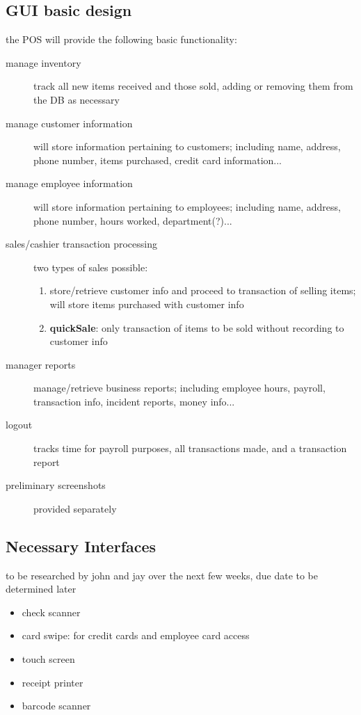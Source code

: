 \documentclass{article}
\begin{document}
\subsection{GUI basic design}
the POS will provide the following basic functionality:
\begin{description}
    \item[manage inventory] track all new items received and those sold, adding or removing them from the DB as necessary
    \item[manage customer information] will store information pertaining to customers; including name, address, phone number, items purchased, credit card information...
    \item[manage employee information] will store information pertaining to employees; including name, address, phone number, hours worked, department(?)...
    \item[sales/cashier transaction processing] two types of sales possible:
    \begin{enumerate}
        \item store/retrieve customer info and proceed to transaction of selling items; will store items purchased with customer info
        \item {\bf quickSale}: only transaction of items to be sold without recording to customer info
    \end{enumerate}
    \item[manager reports] manage/retrieve business reports; including employee hours, payroll, transaction info, incident reports, money info...
    \item[logout] tracks time for payroll purposes, all transactions made, and a transaction report
    \item[preliminary screenshots] provided separately
\end{description}

\subsection{Necessary Interfaces}
to be researched by john and jay over the next few weeks, due date to be determined later
\begin{itemize}
\item check scanner
\item card swipe: for credit cards and employee card access
\item touch screen
\item receipt printer
\item barcode scanner
\end{itemize}
\end{document}
